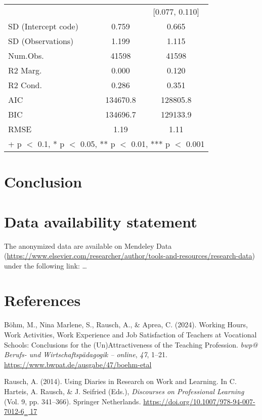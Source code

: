 \documentclass[
]{article}
\newlength{\cslhangindent}
\newenvironment{CSLReferences}[2] %
 {\begin{list}{}{%
  \setlength{\itemindent}{0pt}
  \setlength{\leftmargin}{0pt}
  \setlength{\parsep}{0pt}
  \ifodd #1
   \setlength{\leftmargin}{\cslhangindent}
   \setlength{\itemindent}{-1\cslhangindent}
  \fi
  \setlength{\itemsep}{#2\baselineskip}}}
 {\end{list}}
\begin{document}
\begin{table}[H]
\begin{tabular}[t]{lcc}
 &  & {}[\num{0.077}, \num{0.110}]\\
SD (Intercept code) & \num{0.759} & \num{0.665}\\
SD (Observations) & \num{1.199} & \num{1.115}\\
\midrule
Num.Obs. & \num{41598} & \num{41598}\\
R2 Marg. & \num{0.000} & \num{0.120}\\
R2 Cond. & \num{0.286} & \num{0.351}\\
AIC & \num{134670.8} & \num{128805.8}\\
BIC & \num{134696.7} & \num{129133.9}\\
RMSE & \num{1.19} & \num{1.11}\\
\bottomrule
\multicolumn{3}{l}{\rule{0pt}{1em}+ p $<$ 0.1, * p $<$ 0.05, ** p $<$ 0.01, *** p $<$ 0.001}\\
\end{tabular}
\end{table}

\section{Conclusion}\label{conclusion}

\newpage

\section{Data availability statement}\label{data-availability-statement}

The anonymized data are available on Mendeley Data
(\url{https://www.elsevier.com/researcher/author/tools-and-resources/research-data})
under the following link: \ldots{}\\

\section{References}\label{references}

\label{refs}
\begin{CSLReferences}{1}{0}
Böhm, M., Nina Marlene, S., Rausch, A., \& Aprea, C. (2024). Working
Hours, Work Activities, Work Experience and Job Satisfaction of Teachers
at Vocational Schools: Conclusions for the (Un)Attractiveness of the
Teaching Profession. \emph{bwp@ Berufs- und Wirtschaftspädagogik --
online}, \emph{47}, 1--21.
\url{https://www.bwpat.de/ausgabe/47/boehm-etal}

Rausch, A. (2014). Using {Diaries} in {Research} on {Work} and
{Learning}. In C. Harteis, A. Rausch, \& J. Seifried (Eds.),
\emph{Discourses on {Professional Learning}} (Vol. 9, pp. 341--366).
Springer Netherlands.
\href{https://doi.org/10.1007/978-94-007-7012-6‗\%2017}{https://doi.org/10.1007/978-94-007-7012-6‗
17}

\end{CSLReferences}
\end{document}
